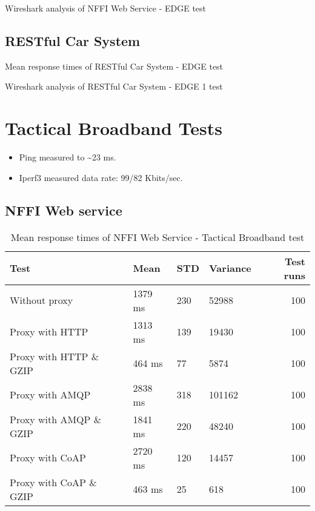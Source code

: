 \begin{appendices}
\begin{table}[H]

\caption{Wireshark analysis of NFFI Web Service - EDGE test}
\end{table}

\subsection{RESTful Car System}

\begin{table}[H]

\caption{Mean response times of RESTful Car System - EDGE test}
\end{table}

\begin{table}[H]

\caption{Wireshark analysis of RESTful Car System - EDGE 1 test}
\end{table}


\section{Tactical Broadband Tests}

\begin{itemize}
	\item Ping measured to \textasciitilde 23 ms.
	\item Iperf3 measured data rate: 99/82 Kbits/sec.
\end{itemize}

\subsection{NFFI Web service}

\begin{table}[H]
\begin{tabular}{llllr}
\hline
 Test                   &   Mean &   STD &   Variance &   Test runs \\
\hline
  Without proxy & 1379 ms & 230 & 52988 & 100 \\
  Proxy with HTTP & 1313 ms & 139 & 19430 & 100 \\
  Proxy with HTTP \& GZIP & 464 ms & 77 & 5874 & 100 \\
  Proxy with AMQP & 2838 ms & 318 & 101162 & 100 \\
  Proxy with AMQP \& GZIP & 1841 ms & 220 & 48240 & 100\\
  Proxy with CoAP & 2720 ms & 120 & 14457 & 100 \\
  Proxy with CoAP \& GZIP & 463 ms & 25 & 618 & 100 \\
\end{tabular}
\caption{Mean response times of NFFI Web Service - Tactical Broadband test}
\end{table}


\end{appendices}
